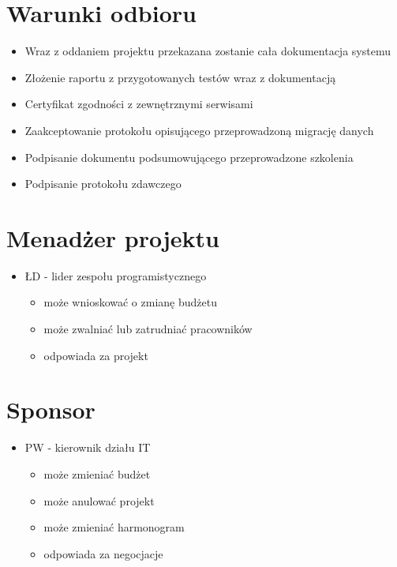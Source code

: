 \documentclass{article}
\begin{document}
\section{Warunki odbioru}
\begin{itemize}
	\item Wraz z oddaniem projektu przekazana zostanie cała dokumentacja systemu
	\item Złożenie raportu z przygotowanych testów wraz z dokumentacją
	\item Certyfikat zgodności z zewnętrznymi serwisami
	\item Zaakceptowanie protokołu opisującego przeprowadzoną migrację danych
	\item Podpisanie dokumentu podsumowującego przeprowadzone szkolenia
	\item Podpisanie protokołu zdawczego	
\end{itemize}

\section{Menadżer projektu}
\begin{itemize}
	\item ŁD - lider zespołu programistycznego
	\begin{itemize}
		\item może wnioskować o zmianę budżetu
		\item może zwalniać lub zatrudniać pracowników
		\item odpowiada za projekt
	\end{itemize}	
\end{itemize}

\section{Sponsor}
\begin{itemize}
	\item PW - kierownik działu IT
	\begin{itemize}
		\item może zmieniać budżet
		\item może anulować projekt
		\item może zmieniać harmonogram
		\item odpowiada za negocjacje	
	\end{itemize}
\end{itemize}
\end{document}
